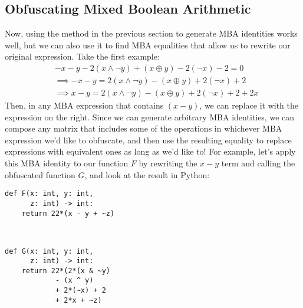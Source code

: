 \subsection{Obfuscating Mixed Boolean Arithmetic}
Now, using the method in the previous section to generate MBA identities works well,
but we can also use it to find MBA equalities that allow us to rewrite our original
expression. Take the first example:
\begin{align*}
    &  - x - y - 2(x \land \neg y) + (x \oplus y) - 2(\neg x) - 2 = 0\\
    &\implies - x - y = 2(x \land \neg y) - (x \oplus y) + 2(\neg x) + 2\\
    &\implies x - y = 2(x \land \neg y) - (x \oplus y) + 2(\neg x) + 2 + 2x
\end{align*}
Then, in any MBA expression that contains $(x - y)$, we can replace it with
the expression on the right. Since we can generate arbitrary MBA identities,
we can compose any matrix that includes some of the operations in whichever
MBA expression we'd like to obfuscate, and then use the resulting equality
to replace expressions with equivalent ones as long as we'd like to! For example, let's
apply this MBA identity to our function $F$ by rewriting the $x-y$ term and calling
the obfuscated function $G$, and look at
the result in Python:
\\
\begin{minipage}{.5\textwidth}
    \begin{small}
    \begin{framed}
        \begin{verbatim}
def F(x: int, y: int,
      z: int) -> int:
    return 22*(x - y + ~z)



        \end{verbatim}
    \end{framed}
    \end{small}
\end{minipage}%
\begin{minipage}{.5\textwidth}
    \begin{framed}
        \begin{small}
        \begin{verbatim}
def G(x: int, y: int,
      z: int) -> int:
    return 22*(2*(x & ~y)
            - (x ^ y)
            + 2*(~x) + 2
            + 2*x + ~z)
        \end{verbatim}
        \end{small}
    \end{framed}
\end{minipage}
